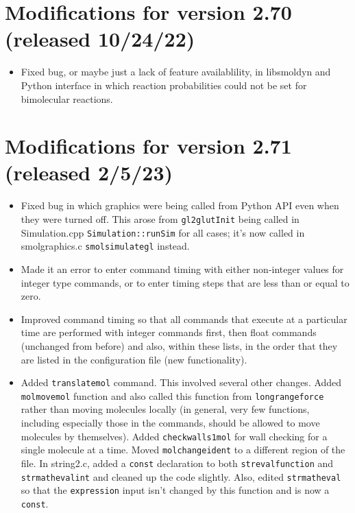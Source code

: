 \documentclass {scrbook}
\newcommand {\ttt} {\texttt}
\begin{document}
\section{Modifications for version 2.70 (released 10/24/22)}
\begin{itemize}
\item Fixed bug, or maybe just a lack of feature availablility, in libsmoldyn and Python interface in which reaction probabilities could not be set for bimolecular reactions.
\end{itemize}

\section{Modifications for version 2.71 (released 2/5/23)}
\begin{itemize}
\item Fixed bug in which graphics were being called from Python API even when they were turned off. This arose from \ttt{gl2glutInit} being called in Simulation.cpp \ttt{Simulation::runSim} for all cases; it's now called in smolgraphics.c \ttt{smolsimulategl} instead.
\item Made it an error to enter command timing with either non-integer values for integer type commands, or to enter timing steps that are less than or equal to zero.
\item Improved command timing so that all commands that execute at a particular time are performed with integer commands first, then float commands (unchanged from before) and also, within these lists, in the order that they are listed in the configuration file (new functionality).
\item Added \ttt{translatemol} command. This involved several other changes. Added \ttt{molmovemol} function and also called this function from \ttt{longrangeforce} rather than moving molecules locally (in general, very few functions, including especially those in the commands, should be allowed to move molecules by themselves). Added \ttt{checkwalls1mol} for wall checking for a single molecule at a time. Moved \ttt{molchangeident} to a different region of the file. In string2.c, added a \ttt{const} declaration to both \ttt{strevalfunction} and \ttt{strmathevalint} and cleaned up the code slightly. Also, edited \ttt{strmatheval} so that the \ttt{expression} input isn't changed by this function and is now a \ttt{const}.
\end{itemize}
\end{document}
